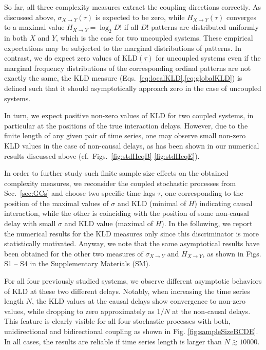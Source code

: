 \documentclass[12pt,aip,cha,reprint,nofootinbib]{revtex4-1}
\begin{document}
{\color{red}So far, all three complexity measures extract the coupling directions correctly. As discussed above, $\sigma_{X\to Y}(\tau)$ is expected to be zero, while $H_{X\to Y}(\tau)$ converges to a maximal value $H_{X \to Y} = \log_2 D!$ if all $D!$ patterns are distributed uniformly in both $X$ and $Y$, which is the case for two uncoupled systems. These empirical expectations may be subjected to the marginal distributions of patterns. In contrast, we do expect zero values of $\text{KLD}(\tau)$ for uncoupled systems even }if the marginal frequency distributions of the corresponding ordinal patterns are not exactly the same, the KLD measure (Eqs.~\ref{eq:localKLD},\ref{eq:globalKLD}) is defined such that it should asymptotically approach zero in the case of uncoupled systems. 

In turn, we expect positive non-zero values of KLD for two coupled systems, in particular at the positions of the true interaction delays. However, due to the finite length of any given pair of time series, one may observe small non-zero KLD values in the case of non-causal delays, as has been shown in our numerical results discussed above (cf.\ Figs.~\ref{fig:stdHeqB}-\ref{fig:stdHeqE}). 

{\color{red}In order to further study such finite sample size effects on the obtained complexity measures, we reconsider the coupled stochastic processes from Sec.~\ref{sec:GCs} and choose two specific time lags $\tau$, one corresponding to the position of the maximal values of $\sigma$ and KLD (minimal of $H$) indicating causal interaction, while the other is coinciding with the position of some non-causal delay with small $\sigma$ and KLD value (maximal of $H$). In the following, we report the numerical results for the KLD measures only since this discriminator is more statistically motivated. Anyway, we note that the same asymptotical results have been obtained for the other two measures of $\sigma_{X\to Y}$ and $H_{X\to Y}$, as shown in Figs. S1 -- S4 in the Supplementary Materials (SM). }

For all four previously studied systems, we observe different asymptotic behaviors of KLD at these two different delays. Notably, when increasing the time series length $N$, the KLD values at the causal delays show convergence to non-zero values, while dropping to zero approximately as $1/N$ at the non-causal delays. This feature is clearly visible for all four stochastic processes with both, unidirectional and bidirectional coupling as shown in Fig. \ref{fig:sampleSizeBCDE}. {\color{red}In all cases, the results are reliable if time series length is larger than $N \gtrsim 10000$. }  
\end{document}
